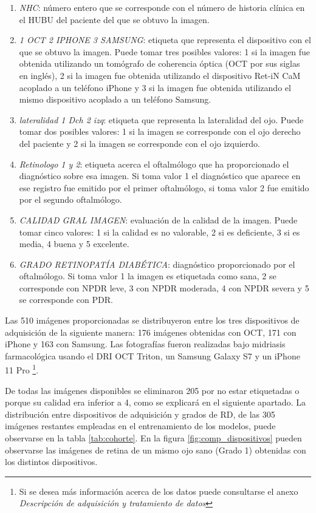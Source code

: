 \begin{enumerate}[itemsep=0.25em]
    \item \textit{NHC}: número entero que se corresponde con el número de historia clínica en el HUBU del paciente del que se obtuvo la imagen.
    \item \textit{1 OCT 2 IPHONE 3 SAMSUNG}: etiqueta que representa el dispositivo con el que se obtuvo la imagen. Puede tomar tres posibles valores: 1 si la imagen fue obtenida utilizando un tomógrafo de coherencia óptica (OCT por sus siglas en inglés), 2 si la imagen fue obtenida utilizando el dispositivo Ret-iN CaM acoplado a un teléfono iPhone y 3 si la imagen fue obtenida utilizando el mismo dispositivo acoplado a un teléfono Samsung.
    \item \textit{lateralidad 1 Dch 2 izq}: etiqueta que representa la lateralidad del ojo. Puede tomar dos posibles valores: 1 si la imagen se corresponde con el ojo derecho del paciente y 2 si la imagen se corresponde con el ojo izquierdo. 
    \item \textit{Retinologo 1 y 2}: etiqueta acerca el oftalmólogo que ha proporcionado el diagnóstico sobre esa imagen. Si toma valor 1 el diagnóstico que aparece en ese registro fue emitido por el primer oftalmólogo, si toma valor 2 fue emitido por el segundo oftalmólogo.
    \item \textit{CALIDAD GRAL IMAGEN}: evaluación de la calidad de la imagen. Puede tomar cinco valores: 1 si la calidad es no valorable, 2 si es deficiente, 3 si es media, 4 buena y 5 excelente.
    \item \textit{GRADO RETINOPATÍA DIABÉTICA}: diagnóstico proporcionado por el oftalmólogo. Si toma valor 1 la imagen es etiquetada como sana, 2 se corresponde con NPDR leve, 3 con NPDR moderada, 4 con NPDR severa y 5 se corresponde con PDR.
\end{enumerate}

Las 510 imágenes proporcionadas se distribuyeron entre los tres dispositivos de adquisición de la siguiente manera: 176 imágenes obtenidas con OCT, 171 con iPhone y 163 con Samsung. Las fotografías fueron realizadas bajo midriasis farmacológica usando el DRI OCT Triton, un Samsung Galaxy S7 y un iPhone 11 Pro \footnote{Si se desea más información acerca de los datos puede consultarse el anexo \textit{Descripción de adquisición y tratamiento de datos}}.

De todas las imágenes disponibles se eliminaron 205 por no estar etiquetadas o porque su calidad era inferior a 4, como se explicará en el siguiente apartado. La distribución entre dispositivos de adquisición y grados de RD, de las 305 imágenes restantes empleadas en el entrenamiento de los modelos, puede observarse en la tabla \ref{tab:cohorte}. En la figura \ref{fig:comp_dispositivos} pueden observarse las imágenes de retina de un mismo ojo sano (Grado 1) obtenidas con los distintos dispositivos. 

